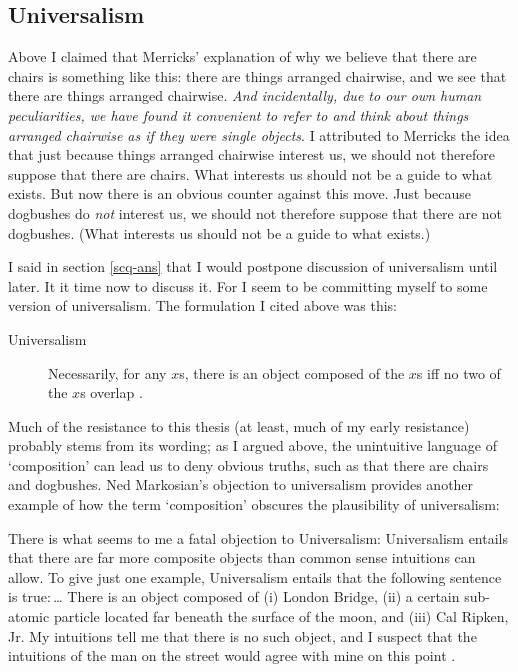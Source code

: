 \documentclass[11pt]{article}
\newenvironment{squote}{%
\begin{spacing}{1}
       	\begin{list}{}{%
\setlength{\labelwidth}{0pt}%
\rightmargin\leftmargin%
}
\item\relax
}{%
\end{list}%
\end{spacing}
}
\begin{document}
\begin{spacing}{1.25}
\section{Universalism}
\label{universalism}
Above I claimed that Merricks' explanation of why we believe that
there are chairs is something like this: there are things arranged
chairwise, and we see that there are things arranged chairwise.  {\em
  And incidentally, due to our own human peculiarities, we have found
  it convenient to refer to and think about things arranged chairwise
  as if they were single objects}.  I attributed to Merricks the idea
that just because things arranged chairwise interest us, we should not
therefore suppose that there are chairs.  What interests us should not
be a guide to what exists.  But now there is an obvious counter
against this move.  Just because dogbushes do {\em not} interest us,
we should not therefore suppose that there are not dogbushes.  (What
interests us should not be a guide to what exists.)

I said in section \ref{scq-ans} that I would postpone discussion of
universalism until later.  It it time now to discuss it.  For I seem
to be committing myself to some version of universalism.  The
formulation I cited above was this:

\begin{description}
\item[Universalism] Necessarily, for any $x$s, there is an object
  composed of the $x$s iff no two of the $x$s overlap
  \citep[227]{markosian1998a}.
\end{description}

Much of the resistance to this thesis (at least, much of my early
resistance) probably stems from its wording; as I argued above, the
unintuitive language of `composition' can lead us to deny obvious
truths, such as that there are chairs and dogbushes.  Ned Markosian's
objection to universalism provides another example of how the term
`composition' obscures the plausibility of universalism:

\begin{squote}
There is what seems to me a fatal objection to Universalism:
Universalism entails that there are far more composite objects than
common sense intuitions can allow.  To give just one example,
Universalism entails that the following sentence is true:\,\ldots
There is an object composed of (i) London Bridge, (ii) a certain
sub-atomic particle located far beneath the surface of the moon, and
(iii) Cal Ripken, Jr.  My intuitions tell me that there is no such
object, and I suspect that the intuitions of the man on the street
would agree with mine on this point \citeyearpar[228]{markosian1998a}.
\end{squote}


\end{spacing}
\end{document}
